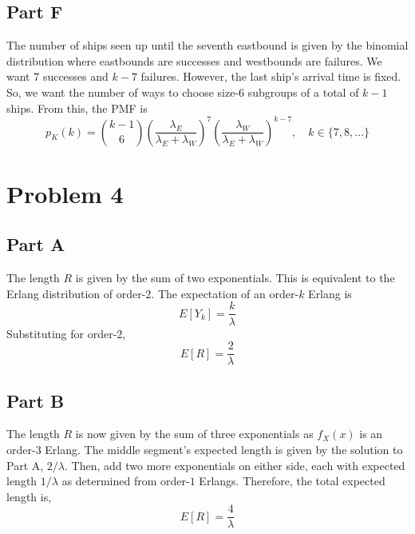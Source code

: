 \documentclass{article}
\begin{document}
\subsection*{Part F}

The number of ships seen up until the seventh eastbound is given by the
binomial distribution where eastbounds are successes and westbounds are
failures. We want $7$ successes and $k - 7$ failures. However, the last
ship's arrival time is fixed. So, we want the number of ways to choose
size-$6$ subgroups of a total of $k - 1$ ships. From this, the PMF is
$$ p_K(k) = \binom{k - 1}{6} \left(\frac{\lambda_E}{\lambda_E +
\lambda_W}\right)^7 \left(\frac{\lambda_W}{\lambda_E + \lambda_W}\right)^{k -
7},\quad k \in \{7, 8, \ldots\} $$

\section*{Problem 4}

\subsection*{Part A}

The length $R$ is given by the sum of two exponentials. This is equivalent to
the Erlang distribution of order-$2$. The expectation of an order-$k$ Erlang is
$$ E[Y_k] = \frac{k}{\lambda} $$
Substituting for order-$2$,
$$ E[R] = \frac{2}{\lambda} $$

\subsection*{Part B}

The length $R$ is now given by the sum of three exponentials as $f_X(x)$ is
an order-$3$ Erlang. The middle segment's expected length is given by the
solution to Part A, $2 / \lambda$. Then, add two more exponentials on either
side, each with expected length $1 / \lambda$ as determined from order-$1$
Erlangs. Therefore, the total expected length is,
$$ E[R] = \frac{4}{\lambda} $$
\end{document}
